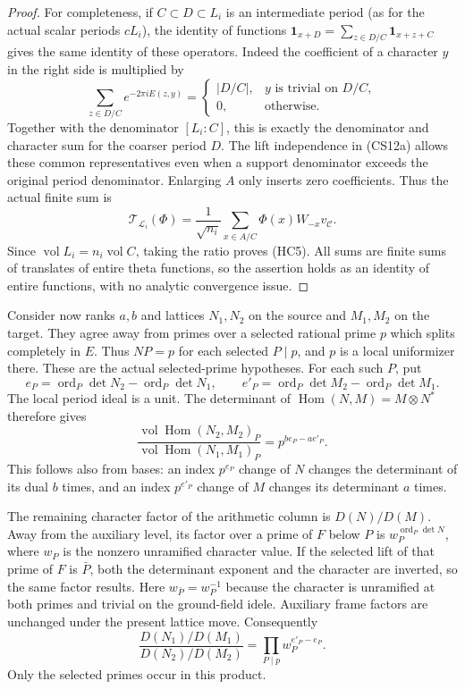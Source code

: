 \begin{proof}
For completeness, if $C\subset D\subset L_i$ is an intermediate
period (as for the actual scalar periods $cL_i$), the
identity of functions
$\mathbf1_{x+D}=\sum_{z\in D/C}\mathbf1_{x+z+C}$ gives the same
identity of these operators. Indeed the coefficient of a character
$y$ in the right side is multiplied by
\[
 \sum_{z\in D/C}e^{-2\pi iE(z,y)}
   =\begin{cases}|D/C|,&y\text{ is trivial on }D/C,\\
                 0,&\text{otherwise}.
     \end{cases}
\]
Together with the denominator $[L_i:C]$, this is exactly the
denominator and character sum for the coarser period $D$.
The lift independence in (CS12a) allows these common representatives
even when a support denominator exceeds the original period
denominator. Enlarging $A$ only inserts zero coefficients.
Thus the actual finite sum is
\[
 \mathcal T_{\mathcal L_i}(\Phi)
    =\frac1{\sqrt{n_i}}\sum_{x\in A/C}
                               \Phi(x)W_{-x}v_{\mathcal C}.
 \tag{HC7}
\]
Since $\operatorname{vol}L_i=n_i\operatorname{vol}C$, taking the
ratio proves (HC5). All sums are finite sums of translates of entire
theta functions, so the assertion holds as an identity of entire
functions, with no analytic convergence issue.
\end{proof}

Consider now ranks $a,b$ and lattices $N_1,N_2$ on the source and
$M_1,M_2$ on the target. They agree away from primes over a selected
rational prime $p$ which splits completely in $E$.
Thus $NP=p$ for each selected $P\mid p$, and $p$ is a local
uniformizer there. These are the actual selected-prime hypotheses.
For each such $P$, put
\[
 e_P=\operatorname{ord}_P\det N_2-\operatorname{ord}_P\det N_1,
 \qquad
 e'_P=\operatorname{ord}_P\det M_2-\operatorname{ord}_P\det M_1.
 \tag{HC8}
\]
The local period ideal is a unit. The determinant of
$\operatorname{Hom}(N,M)=M\otimes N^*$ therefore gives
\[
 \frac{\operatorname{vol}\operatorname{Hom}(N_2,M_2)_P}
      {\operatorname{vol}\operatorname{Hom}(N_1,M_1)_P}
                       =p^{b e_P-a e'_P}.
 \tag{HC9}
\]
This follows also from bases: an index $p^{e_P}$ change of $N$
changes the determinant of its dual $b$ times, and an index
$p^{e'_P}$ change of $M$ changes its determinant $a$ times.

The remaining character factor of the arithmetic column is
$D(N)/D(M)$. Away from the auxiliary level, its factor over a
prime of $F$ below $P$ is $w_P^{\operatorname{ord}_P\det N}$, where
$w_P$ is the nonzero unramified character value. If the selected
lift of that prime of $F$ is $\bar P$, both the determinant exponent
and the character are inverted, so the same factor results.
Here $w_{\bar P}=w_P^{-1}$ because the character is unramified at
both primes and trivial on the ground-field idele. Auxiliary frame
factors are unchanged under the present lattice move. Consequently
\[
 \frac{D(N_1)/D(M_1)}{D(N_2)/D(M_2)}
                         =\prod_{P\mid p}w_P^{e'_P-e_P}.
 \tag{HC10}
\]
Only the selected primes occur in this product.

